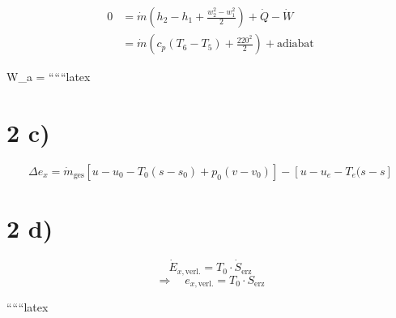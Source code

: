 
\begin{align*}
0 &= \dot{m} \left( h_2 - h_1 + \frac{w_2^2 - w_1^2}{2} \right) + \dot{Q} - \dot{W} \\
&= \dot{m} \left( c_p (T_6 - T_5) + \frac{220^2}{2} \right) + \text{adiabat}
\end{align*}

 \Rightarrow W_a = 
``````latex

\section*{2 c)}
\begin{equation*}
\Delta e_x = \dot{m}_{\text{ges}} \left[ u - u_0 - T_0 (s - s_0) + p_0 (v - v_0) \right] - \left[ u - u_e - T_e (s - s \right]
\end{equation*}

\section*{2 d)}
\begin{equation*}
\dot{E}_{x,\text{verl.}} = T_0 \cdot \dot{S}_{\text{erz}}
\end{equation*}
\begin{equation*}
\Rightarrow \quad e_{x,\text{verl.}} = T_0 \cdot S_{\text{erz}}
\end{equation*}

``````latex


